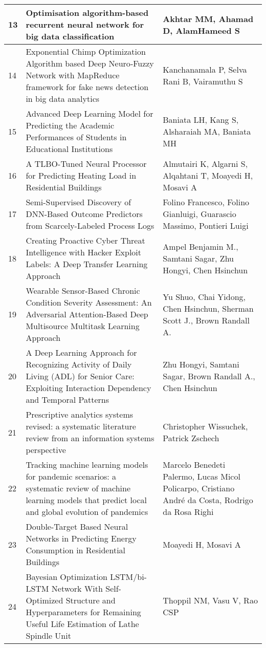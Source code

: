 \begin{landscape}
\begin{longtable}{|p{0.5cm}|p{9cm}|p{7cm}|}
    \hline
    13 & Optimisation algorithm-based recurrent neural network for big data classification & Akhtar MM, Ahamad D, AlamHameed S \\
    \hline
    14 & Exponential Chimp Optimization Algorithm based Deep Neuro‐Fuzzy Network with MapReduce framework for fake news detection in big data analytics & Kanchanamala P, Selva Rani B, Vairamuthu S \\
    \hline
    15 & Advanced Deep Learning Model for Predicting the Academic Performances of Students in Educational Institutions & Baniata LH, Kang S, Alsharaiah MA, Baniata MH \\
    \hline
    16 & A TLBO-Tuned Neural Processor for Predicting Heating Load in Residential Buildings & Almutairi K, Algarni S, Alqahtani T, Moayedi H, Mosavi A \\
    \hline
    17 & Semi-Supervised Discovery of DNN-Based Outcome Predictors from Scarcely-Labeled Process Logs & Folino Francesco, Folino Gianluigi, Guarascio Massimo, Pontieri Luigi \\
    \hline
    18 & Creating Proactive Cyber Threat Intelligence with Hacker Exploit Labels: A Deep Transfer Learning Approach & Ampel Benjamin M., Samtani Sagar, Zhu Hongyi, Chen Hsinchun \\
    \hline
    19 & Wearable Sensor-Based Chronic Condition Severity Assessment: An Adversarial Attention-Based Deep Multisource Multitask Learning Approach & Yu Shuo, Chai Yidong, Chen Hsinchun, Sherman Scott J., Brown Randall A. \\
    \hline
    20 & A Deep Learning Approach for Recognizing Activity of Daily Living (ADL) for Senior Care: Exploiting Interaction Dependency and Temporal Patterns & Zhu Hongyi, Samtani Sagar, Brown Randall A., Chen Hsinchun \\
    \hline
    21 & Prescriptive analytics systems revised: a systematic literature review from an information systems perspective & Christopher Wissuchek, Patrick Zschech \\
    \hline
    22 & Tracking machine learning models for pandemic scenarios: a systematic review of machine learning models that predict local and global evolution of pandemics & Marcelo Benedeti Palermo, Lucas Micol Policarpo, Cristiano André da Costa, Rodrigo da Rosa Righi \\
    \hline
    23 & Double-Target Based Neural Networks in Predicting Energy Consumption in Residential Buildings & Moayedi H, Mosavi A \\
    \hline
    24 & Bayesian Optimization LSTM/bi-LSTM Network With Self-Optimized Structure and Hyperparameters for Remaining Useful Life Estimation of Lathe Spindle Unit & Thoppil NM, Vasu V, Rao CSP \\

\end{longtable}
\end{landscape}
